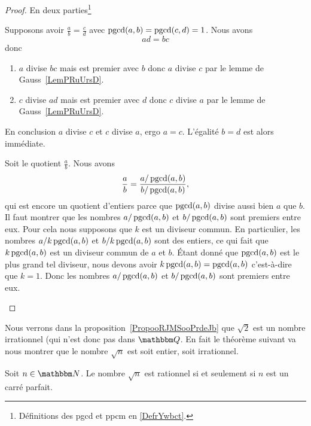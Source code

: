 \begin{proof}
    En deux parties\footnote{Définitions des pgcd et ppcm en \ref{DefrYwbct}.}
    \begin{subproof}
        \item[Unicité]
            Supposons avoir \( \frac{ a }{ b }=\frac{ c }{ d }\) avec \( \operatorname{pgcd}(a,b)=\operatorname{pgcd}(c,d)=1\). Nous avons
            \begin{equation}
                ad=bc
            \end{equation}
            donc
            \begin{enumerate}
                \item
                    \( a\) divise \( bc\) mais est premier avec \( b\) donc \( a\) divise \( c\) par le lemme de Gauss~\ref{LemPRuUrsD}.
                \item
                    \( c\) divise \( ad\) mais est premier avec \( d\) donc \( c\) divise \( a\) par le lemme de Gauss~\ref{LemPRuUrsD}.
            \end{enumerate}
            En conclusion \( a\) divise \( c\) et \( c\) divise \( a\), ergo \( a=c\). L'égalité \( b=d\) est alors immédiate.
        \item[Existence]
            Soit le quotient \( \frac{ a }{ b }\). Nous avons
            \begin{equation}
                \frac{ a }{ b }=\frac{ a/\operatorname{pgcd}(a,b) }{ b/\operatorname{pgcd}(a,b) },
            \end{equation}
            qui est encore un quotient d'entiers parce que \( \operatorname{pgcd}(a,b)\) divise aussi bien \( a\) que \( b\). Il faut montrer que les nombres \( a/\operatorname{pgcd}(a,b)\) et \( b/\operatorname{pgcd}(a,b)\) sont premiers entre eux. Pour cela nous supposons que \( k\) est un diviseur commun. En particulier, les nombres \( a/k\operatorname{pgcd}(a,b)\) et \( b/k\operatorname{pgcd}(a,b)\) sont des entiers, ce qui fait que \( k\operatorname{pgcd}(a,b)\) est un diviseur commun de \( a\) et \( b\). Étant donné que \( \operatorname{pgcd}(a,b)\) est le plus grand tel diviseur, nous devons avoir \( k\operatorname{pgcd}(a,b)=\operatorname{pgcd}(a,b)\) c'est-à-dire que \( k=1\). Donc les nombres \( a/\operatorname{pgcd}(a,b)\) et \( b/\operatorname{pgcd}(a,b)\) sont premiers entre eux.
    \end{subproof}
\end{proof}

Nous verrons dans la proposition~\ref{PropooRJMSooPrdeJb} que \( \sqrt{2}\) est un nombre irrationnel (qui n'est donc pas dans \( \eQ \). En fait le théorème suivant va nous montrer que le nombre \( \sqrt{ n }\) est soit entier, soit irrationnel.
\begin{theorem}     \label{THOooYXJIooWcbnbm}
    Soit \( n\in \eN\). Le nombre \( \sqrt{n}\) est rationnel si et seulement si \( n\) est un carré parfait.
\end{theorem}

